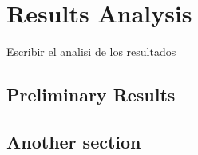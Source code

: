 \chapter{Results Analysis}

Escribir el analisi de los resultados

\section{Preliminary Results} 


\section{Another section}

